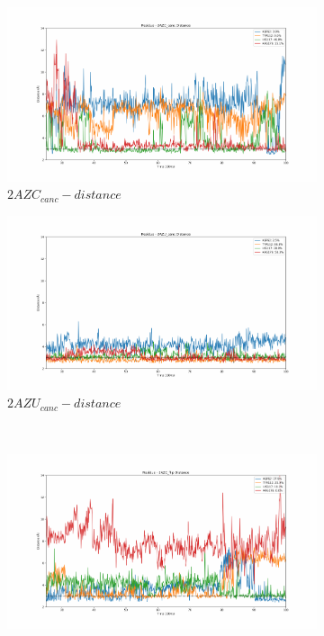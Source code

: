 \documentclass[fleqn,10pt]{wlscirep}
\begin{document}
\begin{figure}[!ht]
\centering
   \begin{subfigure}{.45\textwidth}
     \centering
     \includegraphics[width=.95\linewidth]{2AZC_canc/2AZC_canc-dist_3.pdf}
     \caption{$2AZC_{canc}-distance$}
     \label{fig:2AZC_canc-dist}
   \end{subfigure}
   \begin{subfigure}{.45\textwidth}
     \centering
     \includegraphics[width=.95\linewidth]{2AZU_canc/2AZU_canc-dist_4.pdf}
     \caption{$2AZU_{canc}-distance$}
     \label{fig:2AZU_canc-dist}
   \end{subfigure}
   \\
   \begin{subfigure}{.45\textwidth}
     \centering
     \includegraphics[width=.95\linewidth]{2AZC_flip/2AZC_flip-dist_3.pdf}

\end{subfigure}
\end{figure}
\end{document}

